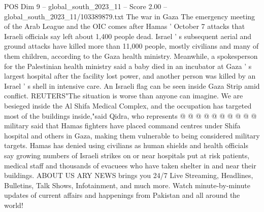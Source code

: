 \begin{textsample}{POS Dim 9 – global\_south\_2023\_11 – Score 2.00 – global\_south\_2023\_11/103389879.txt}
The war in Gaza The emergency meeting of the Arab League and the OIC comes after Hamas ' October 7 attacks that Israeli officials say left about 1,400 people dead.
Israel ' s subsequent aerial and ground attacks have killed more than 11,000 people, mostly civilians and many of them children, according to the Gaza health ministry.
Meanwhile, a spokesperson for the Palestinian health ministry said a baby died in an incubator at Gaza ' s largest hospital after the facility lost power, and another person was killed by an Israel ' s shell in intensive care.
An Israeli flag can be seen inside Gaza Strip amid conflict.
REUTERS"The situation is worse than anyone can imagine.
We are besieged inside the Al Shifa Medical Complex, and the occupation has targeted most of the buildings inside,"said Qidra, who represents @ @ @ @ @ @ @ @ @ @ military said that Hamas fighters have placed command centres under Shifa hospital and others in Gaza, making them vulnerable to being considered military targets.
Hamas has denied using civilians as human shields and health officials say growing numbers of Israeli strikes on or near hospitals put at risk patients, medical staff and thousands of evacuees who have taken shelter in and near their buildings.
ABOUT US ARY NEWS brings you 24/7 Live Streaming, Headlines, Bulletins, Talk Shows, Infotainment, and much more.
Watch minute-by-minute updates of current affairs and happenings from Pakistan and all around the world!

\end{textsample}
